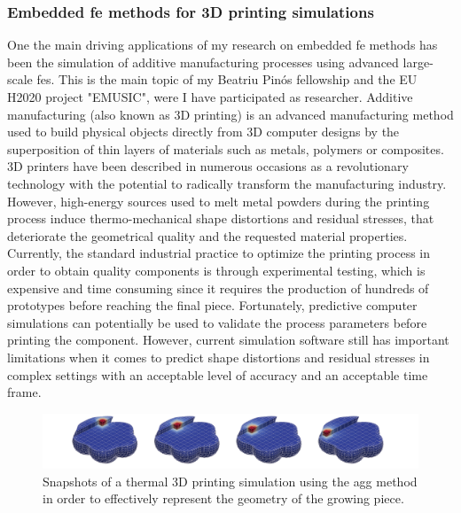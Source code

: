 \documentclass{article}
\begin{document}
\subsubsection{Embedded \ac{fe} methods for 3D printing simulations}

One the main driving applications of my research on embedded \ac{fe} methods has been {{the simulation of additive manufacturing processes using advanced large-scale \acp{fe}}}. This is the main topic of my Beatriu Pinós fellowship and the {{EU H2020 project "EMUSIC"}}, were I have participated as researcher. Additive manufacturing (also known as 3D printing) is an advanced manufacturing method used to build physical objects directly from 3D computer designs by the superposition of thin layers of materials such as metals, polymers or composites. 3D printers have been described in numerous occasions as a revolutionary technology with the potential to radically transform the manufacturing industry. However, high-energy sources used to melt metal powders during the printing process induce thermo-mechanical shape distortions and residual stresses, that deteriorate the geometrical quality and the requested material properties. Currently, the standard industrial practice  to optimize the printing process in order to obtain quality components is through experimental testing, which is expensive and time consuming since it requires the production of hundreds of prototypes before reaching the final piece. Fortunately, predictive computer simulations can potentially be used to validate the process parameters before printing the component. However, current simulation software still has important limitations when it comes to predict shape distortions and residual stresses in complex settings with an acceptable level of accuracy and an acceptable time frame. 

\begin{figure}[ht!]
\includegraphics[width=\textwidth]{../_assets/fig6.png}
\caption{Snapshots of a thermal 3D printing simulation using the \ac{agg} method in order to effectively represent the geometry of the growing piece.}
\label{fig:AM-AggFEM}
\end{figure}
\end{document}
